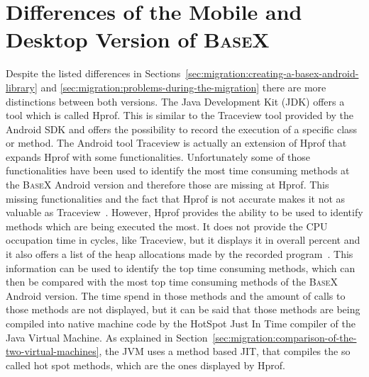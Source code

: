 \newpage
\section{Differences of the Mobile and Desktop Version of \textsc{BaseX}}
\label{sec:differences-of-the-two-basex-versions}
Despite the listed differences in Sections~\ref{sec:migration:creating-a-basex-android-library} and \ref{sec:migration:problems-during-the-migration} there are more distinctions between both versions.
The Java Development Kit (JDK) offers a tool which is called Hprof.
This is similar to the Traceview tool provided by the Android SDK and offers the possibility to record the execution of a specific class or method.
The Android tool Traceview is actually an extension of Hprof that expands Hprof with some functionalities.
Unfortunately some of those functionalities have been used to identify the most time consuming methods at the \textsc{BaseX} Android version and therefore those are missing at Hprof.
This missing functionalities and the fact that Hprof is not accurate makes it not as valuable as Traceview~\cite{mytkowicz2010evaluating}.
However, Hprof provides the ability to be used to identify methods which are being executed the most.
It does not provide the CPU occupation time in cycles, like Traceview, but it displays it in overall percent and it also offers a list of the heap allocations made by the recorded program~\cite{liang1999comprehensive}.
This information can be used to identify the top time consuming methods, which can then be compared with the most top time consuming methods of the \textsc{BaseX} Android version.
The time spend in those methods and the amount of calls to those methods are not displayed, but it can be said that those methods are being compiled into native machine code by the HotSpot Just In Time compiler of the Java Virtual Machine.
As explained in Section~\ref{sec:migration:comparison-of-the-two-virtual-machines}, the JVM uses a method based JIT, that compiles the so called hot spot methods, which are the ones displayed by Hprof. 


